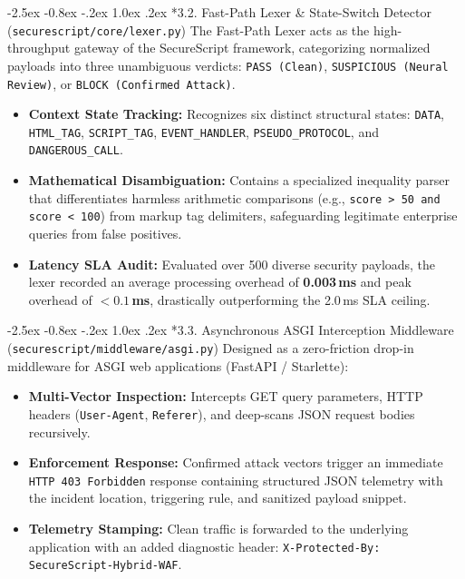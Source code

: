 \documentclass[11pt,a4paper]{article}
\makeatletter
\renewcommand{\subsection}{\@startsection{subsection}{2}{\z@}%
  {-2.5ex \@plus -0.8ex \@minus -.2ex}%
  {1.0ex \@plus .2ex}%
  {\normalfont\normalsize\bfseries\color{secondaryblue}}}
\makeatother
\begin{document}
\subsection*{3.2. Fast-Path Lexer \& State-Switch Detector (\texttt{securescript/core/lexer.py})}
The Fast-Path Lexer acts as the high-throughput gateway of the SecureScript framework, categorizing normalized payloads into three unambiguous verdicts: \texttt{PASS (Clean)}, \texttt{SUSPICIOUS (Neural Review)}, or \texttt{BLOCK (Confirmed Attack)}.
\begin{itemize}[leftmargin=1.5em]
    \item \textbf{Context State Tracking:} Recognizes six distinct structural states: \texttt{DATA}, \texttt{HTML\_TAG}, \texttt{SCRIPT\_TAG}, \texttt{EVENT\_HANDLER}, \texttt{PSEUDO\_PROTOCOL}, and \texttt{DANGEROUS\_CALL}.
    \item \textbf{Mathematical Disambiguation:} Contains a specialized inequality parser that differentiates harmless arithmetic comparisons (e.g., \texttt{score > 50 and score < 100}) from markup tag delimiters, safeguarding legitimate enterprise queries from false positives.
    \item \textbf{Latency SLA Audit:} Evaluated over 500 diverse security payloads, the lexer recorded an average processing overhead of \textbf{0.003\,ms} and peak overhead of \textbf{$< 0.1$\,ms}, drastically outperforming the 2.0\,ms SLA ceiling.
\end{itemize}

\subsection*{3.3. Asynchronous ASGI Interception Middleware (\texttt{securescript/middleware/asgi.py})}
Designed as a zero-friction drop-in middleware for ASGI web applications (FastAPI / Starlette):
\begin{itemize}[leftmargin=1.5em]
    \item \textbf{Multi-Vector Inspection:} Intercepts GET query parameters, HTTP headers (\texttt{User-Agent}, \texttt{Referer}), and deep-scans JSON request bodies recursively.
    \item \textbf{Enforcement Response:} Confirmed attack vectors trigger an immediate \texttt{HTTP 403 Forbidden} response containing structured JSON telemetry with the incident location, triggering rule, and sanitized payload snippet.
    \item \textbf{Telemetry Stamping:} Clean traffic is forwarded to the underlying application with an added diagnostic header: \texttt{X-Protected-By: SecureScript-Hybrid-WAF}.
\end{itemize}
\end{document}
